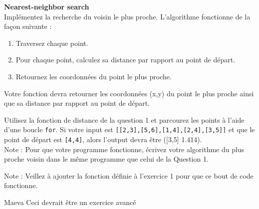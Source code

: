 \begin{Exercice}[10 minutes]\textbf{Nearest-neighbor search}\\

Implémentez la recherche du voisin le plus proche. L'algorithme fonctionne de la façon suivante :
\begin{enumerate}
    \item Traversez chaque point.
    \item Pour chaque point, calculez sa distance par rapport au point de départ.
    \item Retournez les coordonnées du point le plus proche.
\end{enumerate}
Votre fonction devra retourner les coordonnées (x,y) du point le plus proche ainsi que sa distance par rapport au point de départ.
    
\begin{conseil}
    Utilisez la fonction de distance de la question 1 et parcourez les points à l'aide d'une boucle \lstinline{for}. Si votre input est \lstinline{[[2,3],[5,6],[1,4],[2,4],[3,5]]} et que le point de départ est \lstinline{[4,4]}, alors l'output devra être ([3,5] 1.414).\\
    
    Note : Pour que votre programme fonctionne, écrivez votre algorithme du plus proche voisin dans le même programme que celui de la Question 1.
\end{conseil}
\begin{solution}
    Note : Veillez à ajouter la fonction définie à l'exercice 1 pour que ce bout de code fonctionne.
    
\end{solution}
\end{Exercice}
\begin{note}{Maeva}
    Ceci devrait être un exercice avancé
\end{note}
